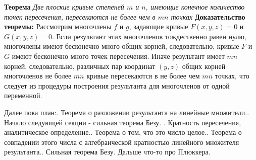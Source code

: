 \documentclass[a4paper, 12pt]{article}
\begin{document}
\bigskip
\textbf{Теорема}
\textit{Две плоские кривые степеней $m$ и $n$, имеющие конечное количество точек пересечения, пересекаются не более чем в $mn$ точках}\newline
\smallskip
\textbf{Доказательство теоремы:}
Рассмотрим многочлены $f$ и $g$, задающие кривые $F(x,y,z) = 0$ и $G(x,y,z) = 0$. Если результант этих многочленов тождественно равен нулю, многочлены имеют бесконечно много общих корней, следовательно, кривые $F$ и $G$ имеют бесконечно много точек пересечения. Иначе результант имеет $mn$ корней, следовательно, различных пар координат $(y,z)$ общих корней многочленов не более $mn$ кривые пересекаются в не более чем $mn$ точках, что следует из процедуры построения результанта для многочленов от одной переменной.

\bigskip
Далее пока план:. Теорема о разложении результанта на линейные множители.. Начало следующей секции - сильная теорема Безу. . Кратность пересечения, аналитическое определение.. Теорема о том, что это число целое.. Теорема о совпадении этого числа с алгебраической кратностью линейного множителя результанта.. Сильная теорема Безу. Дальше что-то про Плюккера.\newline
\end{document}
